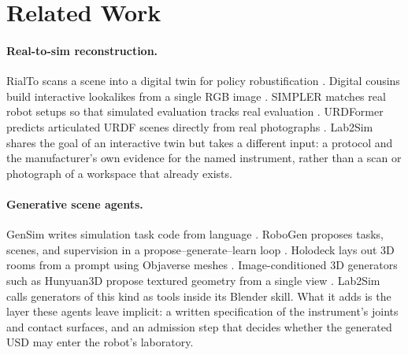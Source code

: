 \section{Related Work}
\label{sec:related-work}

\paragraph{Real-to-sim reconstruction.}
RialTo scans a scene into a digital twin for policy robustification
\citep{torne2024rialto}. Digital cousins build interactive lookalikes from a
single RGB image \citep{dai2024cousins}. SIMPLER matches real robot setups so
that simulated evaluation tracks real evaluation \citep{li2024simpler}.
URDFormer predicts articulated URDF scenes directly from real photographs
\citep{chen2024urdformer}. Lab2Sim shares the goal of an interactive twin but
takes a different input: a protocol and the manufacturer's own evidence for
the named instrument, rather than a scan or photograph of a workspace that
already exists.

\paragraph{Generative scene agents.}
GenSim writes simulation task code from language \citep{wang2024gensim}.
RoboGen proposes tasks, scenes, and supervision in a propose--generate--learn
loop \citep{wang2024robogen}. Holodeck lays out 3D rooms from a prompt using
Objaverse meshes \citep{yang2024holodeck}. Image-conditioned 3D generators such
as Hunyuan3D propose textured geometry from a single view
\citep{zhao2025hunyuan3d}. Lab2Sim calls generators of this kind as tools
inside its Blender skill. What it adds is the layer these agents leave
implicit: a written specification of the instrument's joints and contact
surfaces, and an admission step that decides whether the generated USD may
enter the robot's laboratory.
